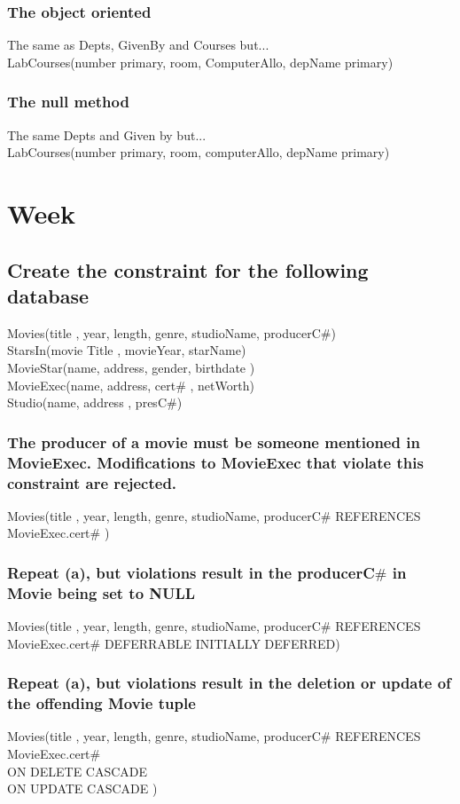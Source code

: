 \documentclass[12pt, a4paper]{article}
\begin{document}
				\subsubsection{The object oriented}
					The same as Depts, GivenBy and Courses but...\\
					LabCourses(number primary, room, ComputerAllo, depName primary)
				\subsubsection{The null method}
					The same Depts and Given by but...\\
					LabCourses(number primary, room, computerAllo, depName primary)
		\section{Week}
			\subsection{Create the constraint for the following database}
				Movies(title , year, length, genre, studioName, producerC$\#$)\\
				StarsIn(movie Title , movieYear, starName)\\
				MovieStar(name, address, gender, birthdate )\\
				MovieExec(name, address, cert$\#$ , netWorth)\\
				Studio(name, address , presC$\#$)
				\subsubsection{The producer of a movie must be someone mentioned in MovieExec. Modifications to MovieExec that violate this constraint are rejected.}
					Movies(title , year, length, genre, studioName, producerC$\#$ REFERENCES MovieExec.cert$\#$ )					
				\subsubsection{Repeat (a), but violations result in the producerC$\#$ in Movie being set to NULL}
					Movies(title , year, length, genre, studioName, producerC$\#$ REFERENCES MovieExec.cert$\#$ DEFERRABLE INITIALLY DEFERRED)									
				\subsubsection{Repeat (a), but violations result in the deletion or update of the offending Movie tuple}
					Movies(title , year, length, genre, studioName, producerC$\#$ REFERENCES MovieExec.cert$\#$\\
						 ON DELETE CASCADE \\
						 ON UPDATE CASCADE  )
\end{document}
